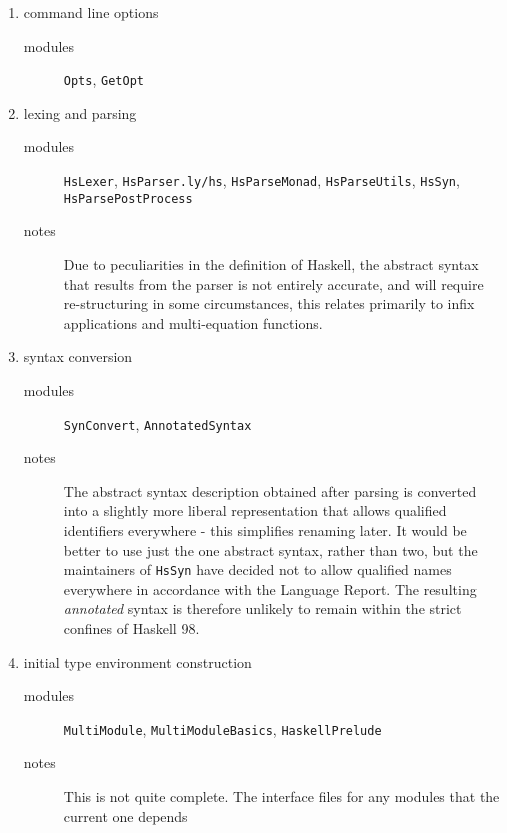 \documentclass{article}
\begin{document}
\begin{enumerate}
\item command line options 
     \begin{description}
     \item[modules] \texttt{Opts}, \texttt{GetOpt}
     \end{description}
\item lexing and parsing
     \begin{description}
     \item[modules] \texttt{HsLexer}, \texttt{HsParser.ly/hs}, 
                    \texttt{HsParseMonad}, \texttt{HsParseUtils}, 
                    \texttt{HsSyn}, \texttt{HsParsePostProcess}
     \item[notes] Due to peculiarities in the definition of Haskell,
                  the abstract syntax that results from the parser is 
                  not entirely accurate, and will require re-structuring
                  in some circumstances, this relates primarily to
                  infix applications and multi-equation functions.
     \end{description}
\item syntax conversion 
     \begin{description}
     \item[modules] \texttt{SynConvert}, \texttt{AnnotatedSyntax}
     \item[notes] The abstract syntax description
                  obtained after parsing is converted into a slightly more liberal
                  representation that allows qualified identifiers
                  everywhere - this simplifies renaming later. It would
                  be better to use just the one abstract syntax, rather
                  than two, but the maintainers of \texttt{HsSyn} have 
                  decided not to allow qualified names everywhere in
                  accordance with the Language Report. The resulting
                  \emph{annotated} syntax is therefore unlikely to remain
                  within the strict confines of Haskell 98. 
     \end{description}
\item initial type environment construction 
     \begin{description}
     \item[modules] \texttt{MultiModule}, \texttt{MultiModuleBasics},
                    \texttt{HaskellPrelude}
     \item[notes] This is not quite complete. The interface
                  files for any modules that the current one depends

\end{description}
\end{enumerate}
\end{document}
